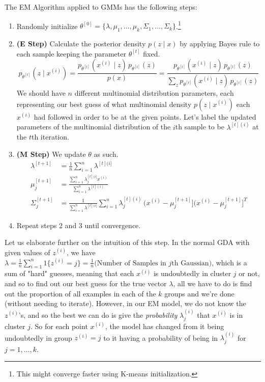   \begin{algo}
    The EM Algorithm applied to GMMs has the following steps:

    \begin{enumerate}
      \item Randomly initialize $\theta^{[0]} = \{\lambda, \mu_1, \ldots, \mu_k, \Sigma_1, \ldots, \Sigma_k\}$.\footnote{This might converge faster using K-means initialization.} 

      \item \textbf{(E Step)} Calculate the posterior density $p(z \mid x)$ by applying Bayes rule to each sample keeping the parameter $\theta^{[t]}$ fixed. 
      \begin{equation}
        p_{\theta^{[t]}} (z \mid x^{(i)}) = \frac{p_{\theta^{[t]}} (x^{(i)} \mid z) \, p_{\theta^{[t]}}(z)}{p(x)} = \frac{p_{\theta^{[t]}} (x^{(i)} \mid z) \, p_{\theta^{[t]}}(z)}{\sum_z p_{\theta^{[t]}} (x^{(i)} \mid z) \, p_{\theta^{[t]}}(z)}
      \end{equation}
      We should have $n$ different multinomial distribution parameters, each representing our best guess of what multinomial density $p(z \mid x^{(i)})$ each $x^{(i)}$ had followed in order to be at the given points. Let's label the updated parameters of the multinomial distribution of the $i$th sample to be $\lambda^{[t](i)}$ at the $t$th iteration. 

      \item \textbf{(M Step)} We update $\theta$ as such. 
      \begin{align}
        \lambda^{[t+1]}  & = \frac{1}{n} \sum_{i=1}^n \lambda^{[t](i]} \\
        \mu_j^{[t+1]} & = \frac{\sum_{i=1}^n \lambda^{[t](i]}_j x^{(i)}}{\sum_{i=1}^n \lambda^{[t](i)}} \\ 
        \Sigma_j^{[t+1]} & = \frac{1}{\sum_{i=1}^n \lambda^{[t](i]}} \sum_{i=1}^n \lambda^{[t](i)}_j \,\big(x^{(i)} - \mu_j^{[t+1]} \big]\big(x^{(i)} - \mu_j^{[t+1]} \big]^T
      \end{align}

      \item Repeat steps 2 and 3 until convergence. 
    \end{enumerate}
  \end{algo}

  Let us elaborate further on the intuition of this step. In the normal GDA with given values of $z^{(i)}$, we have $\lambda= \frac{1}{n} \sum_{i=1}^n 1\{z^{(i)} = j\} = \frac{1}{n}\big(\text{Number of Samples in }j\text{th Gaussian}\big)$, which is a sum of "hard" guesses, meaning that each $x^{(i)}$ is undoubtedly in cluster $j$ or not, and so to find out our best guess for the true vector $\lambda$, all we have to do is find out the proportion of all examples in each of the $k$ groups and we're done (without needing to iterate). However, in our EM model, we do not know the $z^{(i)}$'s, and so the best we can do is give the \textit{probability} $\lambda^{(i)}_j$ that $x^{(i)}$ is in cluster $j$. So for each point $x^{(i)}$, the model has changed from it being undoubtedly in group $z^{(i)} = j$ to it having a probability of being in $\lambda^{(i)}_j$ for $j = 1, \ldots, k$.

